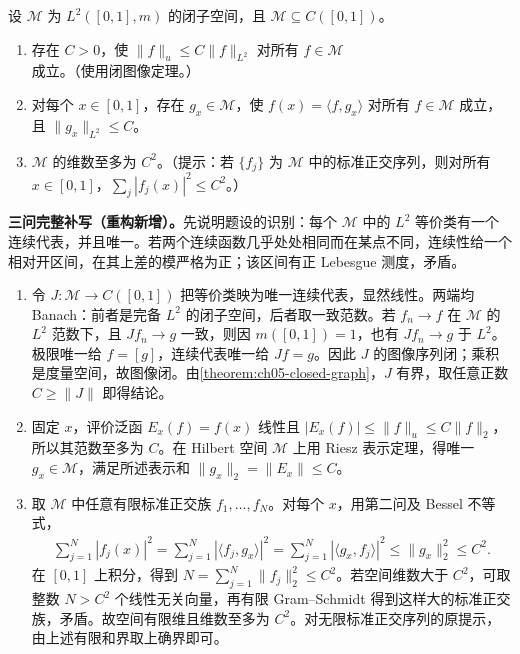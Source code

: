 \documentclass[../../main.tex]{subfiles}
\begin{document}
\begin{exercise}\label{exercise:ch05-closed-continuous-l2-subspace}
设 $\mathscr M$ 为 $L^2([0,1],m)$ 的闭子空间，且 $\mathscr M\subseteq C([0,1])$。
\begin{enumerate}
\item\label{item:ch05-l2-controls-uniform} 存在 $C>0$，使 $\|f\|_u\leqslant C\|f\|_{L^2}$ 对所有 $f\in\mathscr M$ 成立。（使用闭图像定理。）
\item\label{item:ch05-continuous-evaluation-representers} 对每个 $x\in[0,1]$，存在 $g_x\in\mathscr M$，使 $f(x)=\langle f,g_x\rangle$ 对所有 $f\in\mathscr M$ 成立，且 $\|g_x\|_{L^2}\leqslant C$。
\item\label{item:ch05-continuous-subspace-dimension} $\mathscr M$ 的维数至多为 $C^2$。（提示：若 $\{f_j\}$ 为 $\mathscr M$ 中的标准正交序列，则对所有 $x\in[0,1]$，$\sum_j|f_j(x)|^2\leqslant C^2$。）
\end{enumerate}
\end{exercise}
\begin{solution}
\textbf{三问完整补写（重构新增）。}先说明题设的识别：每个 $\mathscr M$ 中的 $L^2$ 等价类有一个连续代表，并且唯一。若两个连续函数几乎处处相同而在某点不同，连续性给一个相对开区间，在其上差的模严格为正；该区间有正 Lebesgue 测度，矛盾。
\begin{enumerate}
\item 令 $J:\mathscr M\to C([0,1])$ 把等价类映为唯一连续代表，显然线性。两端均 Banach：前者是完备 $L^2$ 的闭子空间，后者取一致范数。若 $f_n\to f$ 在 $\mathscr M$ 的 $L^2$ 范数下，且 $Jf_n\to g$ 一致，则因 $m([0,1])=1$，也有 $Jf_n\to g$ 于 $L^2$。极限唯一给 $f=[g]$，连续代表唯一给 $Jf=g$。因此 $J$ 的图像序列闭；乘积是度量空间，故图像闭。由\cref{theorem:ch05-closed-graph}，$J$ 有界，取任意正数 $C\geqslant\|J\|$ 即得结论。
\item 固定 $x$，评价泛函 $E_x(f)=f(x)$ 线性且 $|E_x(f)|\leqslant\|f\|_u\leqslant C\|f\|_2$，所以其范数至多为 $C$。在 Hilbert 空间 $\mathscr M$ 上用 Riesz 表示定理，得唯一 $g_x\in\mathscr M$，满足所述表示和 $\|g_x\|_2=\|E_x\|\leqslant C$。
\item 取 $\mathscr M$ 中任意有限标准正交族 $f_1,\ldots,f_N$。对每个 $x$，用第二问及 Bessel 不等式，
\begin{align*}
\sum_{j=1}^N|f_j(x)|^2
=\sum_{j=1}^N|\langle f_j,g_x\rangle|^2
=\sum_{j=1}^N|\langle g_x,f_j\rangle|^2
\leqslant\|g_x\|_2^2\leqslant C^2.
\end{align*}
在 $[0,1]$ 上积分，得到 $N=\sum_{j=1}^N\|f_j\|_2^2\leqslant C^2$。若空间维数大于 $C^2$，可取整数 $N>C^2$ 个线性无关向量，再有限 Gram--Schmidt 得到这样大的标准正交族，矛盾。故空间有限维且维数至多为 $C^2$。对无限标准正交序列的原提示，由上述有限和界取上确界即可。
\end{enumerate}
\end{solution}
\end{document}
